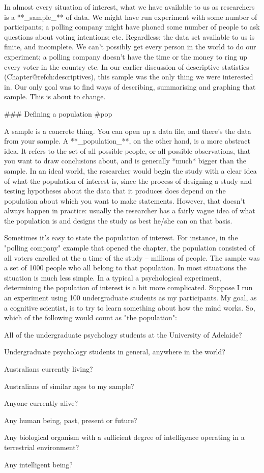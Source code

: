 In almost every situation of interest, what we have available to us as researchers is a **_sample_** of data. We might have run experiment with some number of participants; a polling company might have phoned some number of people to ask questions about voting intentions; etc. Regardless: the data set available to us is finite, and incomplete. We can't possibly get every person in the  world to do our experiment; a polling company doesn't have the time or the money to ring up every voter in the country etc. In our earlier discussion of descriptive statistics (Chapter@refch:descriptives), this sample was the only thing we were interested in. Our only goal was to find ways of describing, summarising and graphing that sample. This is about to change.

### Defining a population {#pop}

A sample is a concrete thing. You can open up a data file, and there's the data from your sample. A **_population_**, on the other hand, is a more abstract idea. It refers to the set of all possible people, or all possible observations, that you want to draw conclusions about, and is generally *much* bigger than the sample. In an ideal world, the researcher would begin the study with a clear idea of what the population of interest is, since the process of designing a study and testing hypotheses about the data that it produces does depend on the population about which you want to make statements. However, that doesn't always happen in practice: usually the researcher has a fairly vague idea of what the population is and designs the study as best he/she can on that basis. 

Sometimes it's easy to state the population of interest. For instance, in the "polling company" example that opened the chapter, the population consisted of all  voters enrolled at the a time of the study -- millions of people. The sample was a set of 1000 people who all belong to that population. In most situations the situation is much less simple. In a typical a psychological experiment, determining the population of interest is a bit more complicated. Suppose I run an experiment using 100 undergraduate students as my participants. My goal, as a cognitive scientist, is to try to learn something about how the mind works. So, which of the following would count as "the population":
 \itemsep -2pt
\item All of the undergraduate psychology students at the University of Adelaide?
\item Undergraduate psychology students in general, anywhere in the world?
\item Australians currently living?
\item Australians of similar ages to my sample?
\item Anyone currently alive?
\item Any human being, past, present or future?
\item Any biological organism with a sufficient degree of intelligence operating in a terrestrial environment?
\item Any intelligent being?

